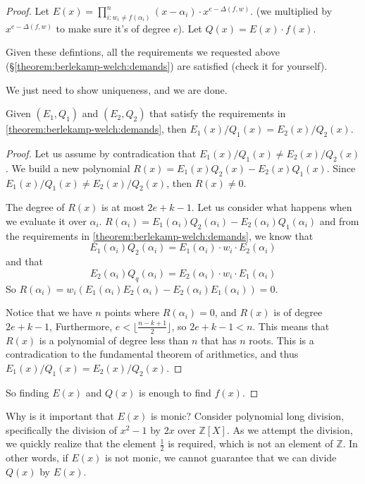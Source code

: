 \begin{proof}
    Let $E(x)=\prod_{i:w_i\ne f(\alpha_i)}^{n} (x-\alpha_i)\cdot x^{e-\Delta(f,w)}$.
    (we multiplied by $x^{e-\Delta(f,w)}$ to make sure it's of degree $e$).
    Let $Q(x)=E(x)\cdot f(x)$.
    
    Given these defintions, all the requirements we requested above 
    (\S\ref{theorem:berlekamp-welch:demands}) are satisfied (check it for yourself).

    We just need to show uniqueness, and we are done.
    \begin{lemma}
        Given $(E_1, Q_1)$ and $(E_2, Q_2)$ that satisfy the requirements in
         \ref{theorem:berlekamp-welch:demands},
        then $E_1(x)/Q_1(x) = E_2(x)/Q_2(x)$.
    \end{lemma}

    \begin{proof}
        Let us assume by contradication that $E_1(x)/Q_1(x) \ne E_2(x)/Q_2(x)$.
        We build a new polynomial  $R(x)=E_1(x)Q_2(x) - E_2(x)Q_1(x)$.
        Since $E_1(x)/Q_1(x) \ne E_2(x)/Q_2(x)$, then $R(x)\ne 0$.

        The degree of $R(x)$ is at most $2e+k-1$. Let us consider what happens when we 
        evaluate it over $\alpha_i$.
        $R(\alpha_i)= E_1(\alpha_i)Q_2(\alpha_i) - E_2(\alpha_i)Q_1(\alpha_i)$
        and from the requirements in \ref{theorem:berlekamp-welch:demands}, we know that
        $$E_1(\alpha_i)Q_2(\alpha_i) = E_1(\alpha_i)\cdot w_i\cdot E_2(\alpha_i)$$
        and that 
        $$E_2(\alpha_i)Q_q(\alpha_i) = E_2(\alpha_i)\cdot w_i\cdot E_1(\alpha_i)$$
        So $R(\alpha_i)= w_i(E_1(\alpha_i)E_2(\alpha_i) - E_2(\alpha_i)E_1(\alpha_i))=0$.

        Notice that we have $n$ points where $R(\alpha_i)=0$, and $R(x)$ is 
        of degree $2e+k-1$,
        Furthermore, $e<\lfloor \frac{n-k+1}{2}\rfloor$, so $2e+k-1<n$.
        This means that $R(x)$ is a polynomial of degree less than $n$ that has $n$ roots.
        This is a contradication to the fundamental theorem of arithmetics,
        and thus $E_1(x)/Q_1(x) = E_2(x)/Q_2(x)$.
    \end{proof}

    So finding $E(x)$ and $Q(x)$ is enough to find $f(x)$.
\end{proof}


\begin{bclogo}[logo=\bcquestion]{Why is it important that $E(x)$ is monic?}
    Consider polynomial long division, specifically 
    the division of $x^2-1$ by $2x$ over $\mathbb{Z}[X]$. 
    As we attempt the division, we quickly realize that the element 
    $\frac{1}{2}$ is required, which is not an element of $\mathbb{Z}$. 
    In other words, if $E(x)$ is not monic, we cannot guarantee 
    that we can divide $Q(x)$ by $E(x)$.
\end{bclogo}

